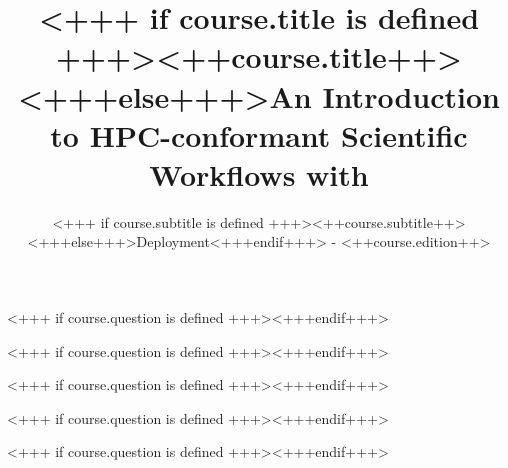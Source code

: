 \documentclass[english,xcolor=pdftex,dvipsnames,aspectratio=<+++ if course.aspectratio is defined +++><++course.aspectratio++><+++else+++>43<+++endif+++>]{beamer}
\title[<++course.shorttitle++>]{<+++ if course.title is defined +++><++course.title++><+++else+++>An Introduction to HPC-conformant Scientific Workflows with \Snakemake<+++endif+++>}
\subtitle{<+++ if course.subtitle is defined +++><++course.subtitle++><+++else+++>Deployment<+++endif+++> - <++course.edition++>}
\begin{document}

\sloppy

\begin{frame}[plain] %
  \titlepage
\end{frame}












<+++ if course.question is defined +++><+++endif+++>


<+++ if course.question is defined +++><+++endif+++>

% 


<+++ if course.question is defined +++><+++endif+++>


<+++ if course.question is defined +++><+++endif+++>


<+++ if course.question is defined +++><+++endif+++>
\end{document}
